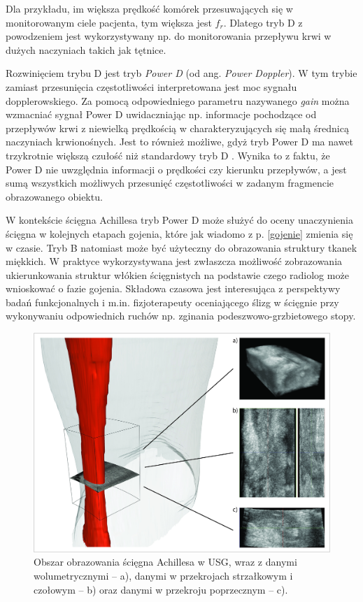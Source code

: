 Dla przykładu, im większa prędkość komórek przesuwających się w monitorowanym ciele pacjenta, tym większa jest $f_r$. Dlatego tryb D z powodzeniem jest wykorzystywany np. do monitorowania przepływu krwi w dużych naczyniach takich jak tętnice.

Rozwinięciem trybu D jest tryb \textit{Power D} (od ang. \textit{Power Doppler}). W tym trybie zamiast przesunięcia częstotliwości interpretowana jest moc sygnału dopplerowskiego. Za pomocą odpowiedniego parametru nazywanego \textit{gain} można wzmacniać sygnał Power D uwidaczniając np. informacje pochodzące od przepływów krwi z niewielką prędkością w charakteryzujących się małą średnicą naczyniach krwionośnych. Jest to również możliwe, gdyż tryb Power D ma nawet trzykrotnie większą czułość niż standardowy tryb D \cite{Babcock1996}. Wynika to z faktu, że Power D nie uwzględnia informacji o prędkości czy kierunku przepływów, a jest sumą wszystkich możliwych przesunięć częstotliwości w zadanym fragmencie obrazowanego obiektu.

W kontekście ścięgna Achillesa tryb Power D może służyć do oceny unaczynienia ścięgna w kolejnych etapach gojenia, które jak wiadomo z p. \ref{gojenie} zmienia się w czasie. Tryb B natomiast może być użyteczny do obrazowania struktury tkanek miękkich. W praktyce wykorzystywana jest zwłaszcza możliwość zobrazowania ukierunkowania struktur włókien ścięgnistych na podstawie czego radiolog może wnioskować o fazie gojenia. Składowa czasowa jest interesująca z perspektywy badań funkcjonalnych i m.in. fizjoterapeuty oceniającego ślizg w ścięgnie przy wykonywaniu odpowiednich ruchów np. zginania podeszwowo-grzbietowego stopy. 

\begin{figure}[h!]
	\centering
	\includegraphics[width=1\textwidth]{figures/sciegnoUSG.jpg}
	\caption{Obszar obrazowania ścięgna Achillesa w USG, wraz z danymi wolumetrycznymi -- a), danymi w przekrojach strzałkowym i czołowym -- b) oraz danymi w przekroju poprzecznym -- c).}
	\label{sagittalAchillesComp}
\end{figure}



